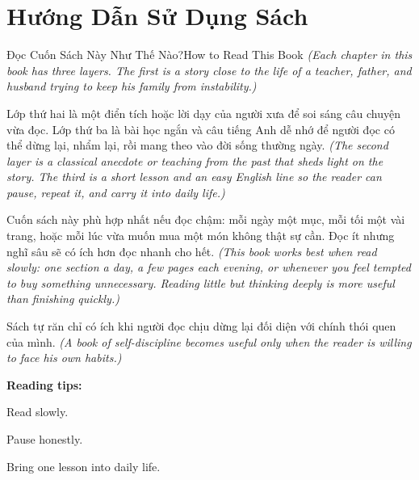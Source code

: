 \chapter*{Hướng Dẫn Sử Dụng Sách}

\begin{truyen}{Đọc Cuốn Sách Này Như Thế Nào?}{How to Read This Book}
\textit{(Each chapter in this book has three layers. The first is a story close to the life of a teacher, father, and husband trying to keep his family from instability.)}

Lớp thứ hai là một điển tích hoặc lời dạy của người xưa để soi sáng câu chuyện vừa đọc. Lớp thứ ba là bài học ngắn và câu tiếng Anh dễ nhớ để người đọc có thể dừng lại, nhẩm lại, rồi mang theo vào đời sống thường ngày.
\textit{(The second layer is a classical anecdote or teaching from the past that sheds light on the story. The third is a short lesson and an easy English line so the reader can pause, repeat it, and carry it into daily life.)}

Cuốn sách này phù hợp nhất nếu đọc chậm: mỗi ngày một mục, mỗi tối một vài trang, hoặc mỗi lúc vừa muốn mua một món không thật sự cần. Đọc ít nhưng nghĩ sâu sẽ có ích hơn đọc nhanh cho hết.
\textit{(This book works best when read slowly: one section a day, a few pages each evening, or whenever you feel tempted to buy something unnecessary. Reading little but thinking deeply is more useful than finishing quickly.)}
\end{truyen}

\begin{baihoc}
Sách tự răn chỉ có ích khi người đọc chịu dừng lại đối diện với chính thói quen của mình.
\textit{(A book of self-discipline becomes useful only when the reader is willing to face his own habits.)}
\end{baihoc}

\begin{ghinhoanh}
\textbf{Reading tips:}

Read slowly.

Pause honestly.

Bring one lesson into daily life.
\end{ghinhoanh}

\ngancach